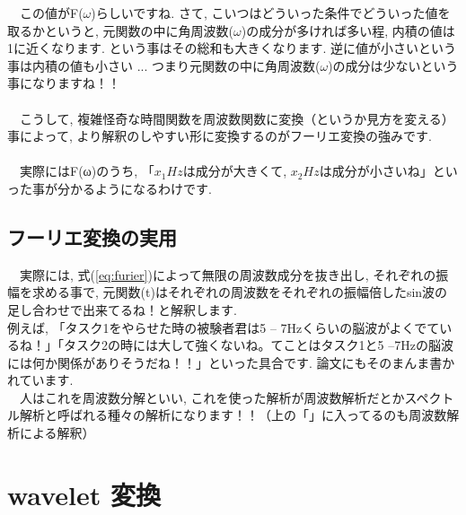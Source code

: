\documentclass[11pt,a4paper,uplatex]{ujreport} 	%
\begin{document}
　この値がF($\omega$)らしいですね. さて, こいつはどういった条件でどういった値を取るかというと, 元関数の中に角周波数($\omega$)の成分が多ければ多い程, 内積の値は1に近くなります. という事はその総和も大きくなります. 逆に値が小さいという事は内積の値も小さい ... つまり元関数の中に角周波数($\omega$)の成分は少ないという事になりますね！！\\
\\
　こうして, 複雑怪奇な時間関数を周波数関数に変換（というか見方を変える）事によって, より解釈のしやすい形に変換するのがフーリエ変換の強みです.\\
\\
　実際にはF(ω)のうち, 「$x_1Hz$は成分が大きくて, $x_2Hz$は成分が小さいね」といった事が分かるようになるわけです.
\subsection{フーリエ変換の実用}
　実際には, 式(\ref{eq:furier})によって無限の周波数成分を抜き出し, それぞれの振幅を求める事で, 元関数(t)はそれぞれの周波数をそれぞれの振幅倍したsin波の足し合わせで出来てるね！と解釈します.\\
例えば, 「タスク1をやらせた時の被験者君は5 -- 7Hzくらいの脳波がよくでているね！」「タスク2の時には大して強くないね。てことはタスク1と5 --7Hzの脳波には何か関係がありそうだね！！」といった具合です. 論文にもそのまんま書かれています.
\\
　人はこれを周波数分解といい, これを使った解析が周波数解析だとかスペクトル解析と呼ばれる種々の解析になります！！（上の「」に入ってるのも周波数解析による解釈）
\section{wavelet 変換}
\end{document}
